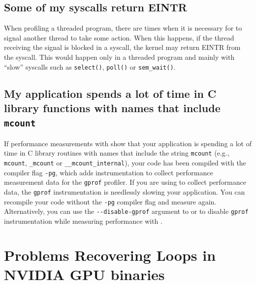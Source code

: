 \documentclass[11pt,twoside,letterpaper]{report}
\begin{document}

\subsection{Some of my syscalls return EINTR}

When profiling a threaded program, there are times when it is
necessary for \hpcrun{} to signal another thread to take some action.
When this happens, if the thread receiving the signal is blocked in a
syscall, the kernel may return EINTR from the syscall.  This would
happen only in a threaded program and mainly with ``slow'' syscalls
such as {\tt select()}, {\tt poll()} or {\tt sem\_wait()}.



\subsection{My application spends a lot of time in C library functions with names that include {\tt mcount}}

If performance measurements with \HPCToolkit{} show that your
application is spending a lot of time in C library routines with
names that include the string {\tt mcount} (e.g., \verb|mcount|, \verb|_mcount| or
\verb|__mcount_internal|), your code has been compiled with the compiler
flag \verb|-pg|, which adds instrumentation to collect performance
measurement data for the \verb|gprof| profiler.  If you are using
\HPCToolkit{} to collect performance data, the \verb|gprof| instrumentation
is needlessly slowing your application. You can recompile your code without the
\verb|-pg| compiler flag and measure again. Alternatively, you can use the \verb|--disable-gprof|
argument to \hpcrun{} or \hpclink{} to disable \verb|gprof| instrumentation while
measuring performance with \HPCToolkit{}.

\section{Problems Recovering Loops in NVIDIA GPU binaries}
\label{section:hpcstruct-cubin}
\end{document}
